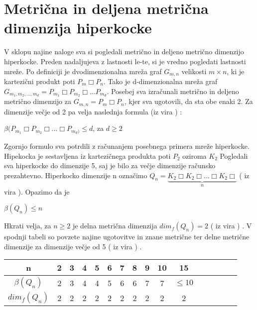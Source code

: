 \documentclass[a4paper]{report}
\begin{document}
	\section*{Metrična in deljena metrična dimenzija hiperkocke}
	V sklopu najine naloge sva si pogledali metrično in deljeno metrično dimenzijo hiperkocke. Preden nadaljujeva z lastnosti le-te, si je vredno pogledati lastnosti mreže.
	Po definiciji je dvodimenzionalna mreža graf $G_{m,n}$ velikosti $m\times n$, ki je kartezični produkt poti $P_{m}\Box P_{n}$. Tako je d-dimenzionalna mreža graf $G_{m_{1},m_{2},\dots,m_{d}} = P_{m_{1}}\Box P_{m_{2}}\Box \dots P_{m_{d}}$. Posebej sva izračunali metrično in deljeno metrično dimenzijo za  $G_{m,n}=P_{m}\Box P_{n}$, kjer sva ugotovili, da sta obe enaki 2. Za dimenzije večje od 2 pa velja naslednja formula (iz vira \cite{3}) : \\
	\begin{center}
		$\beta(P_{m_{1}}\Box P_{m_{2}}\Box \dots \Box P_{m_{d})} \le d$, za $d\ge 2$
	\end{center}
	Zgornjo formulo sva potrdili z računanjem posebnega primera mreže hiperkocke. Hipekocka je sestavljena iz kartezičnega produkta poti $P_{2}$ oziroma $K_{2}$ Pogledali sva  hiperkocke do dimenzije 5, saj je bilo za večje dimenzije računsko prezahtevno. Hiperkocko dimenzije n označimo $Q_{n} = \underbrace{K_{2} \Box K_{2}\Box \dots \Box K_{2}\Box}_{n}$ ( iz vira \cite{4}). Opazimo da je
	\begin{center}
		$\beta(Q_{n})\le n$
	\end{center}
	Hkrati velja, za $n \ge 2$ je delna metrična dimenzija $dim_{f}(Q_{n}) = 2$ ( iz vira \cite{2}) . 
	V spodnji tabeli so povzete najine ugotovitve in znane metrične ter delne metrične dimenzije za dimenzije večje od 5 ( iz vira \cite{3}) .
	
	
	\begin{center}
		\begin{tabular}{|c||c|c|c|c|c|c|c|c|c|c|c|c|c|c|c}
			\hline
			\hline
			n&2&3&4&5&6&7&8&9&10&15\\
			\hline
			$\beta(Q_{n})$&2&3&4&4&5&6&6&7&7& $\le 10$ \\
			\hline
			$dim_{f}(Q_{n})$&2&2&2&2&2&2&2&2&2&2\\
			\hline
			\hline
		\end{tabular}
	\end{center}
\end{document}
